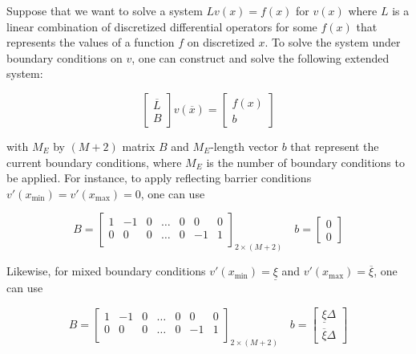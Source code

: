 \documentclass[11pt]{article}
\begin{document}
Suppose that we want to solve a system $L v({x}) = f(x) $ for $v(x)$ where $L$ is a linear combination of discretized differential operators for some $f(x)$ that represents the values of a function $f$ on discretized $x$. To solve the system under boundary conditions on $v$, one can construct and solve the following extended system:

\begin{equation}\label{eq:extended-system}
\begin{bmatrix}
\overline{L} \\
B
\end{bmatrix} 
v(\overline{x}) = 
\begin{bmatrix}
f(x) \\
b
\end{bmatrix} 
\end{equation}

with $M_E$ by $(M+2)$ matrix $B$ and $M_E$-length vector $b$ that represent the current boundary conditions, where $M_E$ is the number of boundary conditions to be applied. For instance, to apply reflecting barrier conditions $v'(x_{\min}) = v'(x_{\max}) = 0$, one can use

\begin{equation}\label{eq:reflecting-barrier-matrix}
B = \begin{bmatrix}
1 & -1 & 0 & \dots & 0 & 0 & 0 \\
0 & 0 & 0 & \dots & 0 & -1 & 1\\
\end{bmatrix}_{2 \times (M+2)} \quad 
b = \begin{bmatrix}
0 \\
0
\end{bmatrix}
\end{equation}

Likewise, for mixed boundary conditions $v'(x_{\min}) = \underline{\xi}$ and $v'(x_{\max}) = \overline{\xi}$, one can use

\begin{equation}\label{eq:mixed-boundary-matrix}
B = \begin{bmatrix}
1 & -1 & 0 & \dots & 0 & 0 & 0 \\
0 & 0 & 0 & \dots & 0 & -1 & 1\\
\end{bmatrix}_{2 \times (M+2)} \quad 
b = \begin{bmatrix}
 \underline{\xi} \Delta \\
\overline{\xi} \Delta
\end{bmatrix}
\end{equation}



\end{document}
